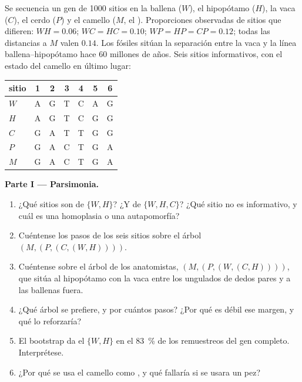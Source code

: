 \begin{problem}
\label{pb:b2:phylogenetic-trees:1}
Se secuencia un gen de \num{1000} sitios en la ballena ($W$), el
hipopótamo ($H$), la vaca ($C$), el cerdo ($P$) y el camello ($M$, el
). Proporciones observadas de sitios que difieren: $WH = 0.06$; $WC = HC = 0.10$; $WP =
HP = CP = 0.12$; todas las distancias a $M$ valen $0.14$. Los fósiles
sitúan la separación entre la vaca y la línea ballena--hipopótamo hace 60
millones de años. Seis sitios informativos, con el estado del camello en
último lugar:
\begin{center}
\begin{tabular}{l@{\quad}cccccc}
sitio & 1 & 2 & 3 & 4 & 5 & 6 \\ \hline
$W$ & A & G & T & C & A & G \\
$H$ & A & G & T & C & G & G \\
$C$ & G & A & T & T & G & G \\
$P$ & G & A & C & T & G & A \\
$M$ & G & A & C & T & G & A \\
\end{tabular}
\end{center}

\medskip
\noindent\textbf{Parte I --- Parsimonia.}
\begin{enumerate}
  \item ¿Qué sitios son  de $\{W, H\}$? ¿Y de $\{W, H,
        C\}$? ¿Qué sitio no es informativo, y cuál es una homoplasia
        o una autapomorfía?
  \item Cuéntense los pasos de los seis sitios sobre el árbol
        $(M,(P,(C,(W,H))))$.
  \item Cuéntense sobre el árbol de los anatomistas, $(M,(P,(W,(C,H))))$,
        que sitúa al hipopótamo con la vaca entre los ungulados de dedos
        pares y a las ballenas fuera.
  \item ¿Qué árbol se prefiere, y por cuántos pasos? ¿Por qué es débil ese
        margen, y qué lo reforzaría?
  \item El bootstrap da el  $\{W, H\}$ en el \qty{83}{\%} de los
        remuestreos del gen completo. Interprétese.
  \item ¿Por qué se usa el camello como , y qué fallaría si se
        usara un pez?
\end{enumerate}


\end{problem}
